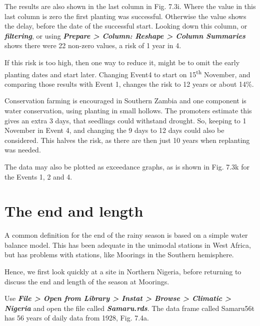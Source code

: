 \documentclass[
  letterpaper,
  DIV=11,
  numbers=noendperiod]{scrreprt}
\begin{document}
The results are also shown in the last column in Fig. 7.3i. Where the
value in this last column is zero the first planting was successful.
Otherwise the value shows the delay, before the date of the successful
start. Looking down this column, or \textbf{\emph{filtering}}, or using
\textbf{\emph{Prepare \textgreater{} Column: Reshape \textgreater{}
Column Summaries}} shows there were 22 non-zero values, a risk of 1 year
in 4.

If this risk is too high, then one way to reduce it, might be to omit
the early planting dates and start later. Changing Event4 to start on
15\textsuperscript{th} November, and comparing those results with Event
1, changes the risk to 12 years or about 14\%.

Conservation farming is encouraged in Southern Zambia and one component
is water conservation, using planting in small hollows. The promoters
estimate this gives an extra 3 days, that seedlings could withstand
drought. So, keeping to 1 November in Event 4, and changing the 9 days
to 12 days could also be considered. This halves the risk, as there are
then just 10 years when replanting was needed.

The data may also be plotted as exceedance graphs, as is shown in Fig.
7.3k for the Events 1, 2 and 4.

\section{The end and length}\label{the-end-and-length}

A common definition for the end of the rainy season is based on a simple
water balance model. This has been adequate in the unimodal stations in
West Africa, but has problems with stations, like Moorings in the
Southern hemisphere.

Hence, we first look quickly at a site in Northern Nigeria, before
returning to discuss the end and length of the season at Moorings.

Use \textbf{\emph{File \textgreater{} Open from Library \textgreater{}
Instat \textgreater{} Browse \textgreater{} Climatic \textgreater{}
Nigeria}} and open the file called \textbf{\emph{Samaru.rds}}. The data
frame called Samaru56t has 56 years of daily data from 1928, Fig. 7.4a.
\end{document}
